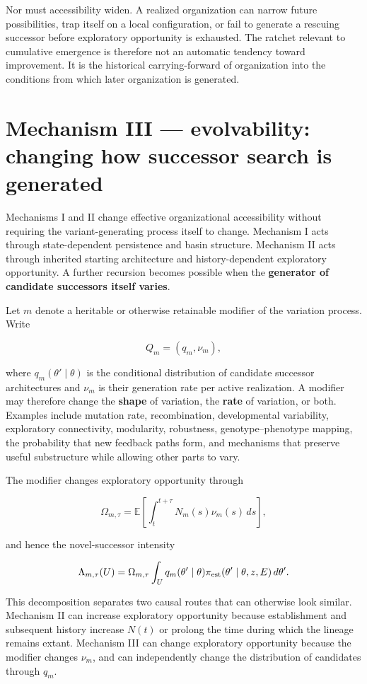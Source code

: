 \documentclass[11pt,a4paper]{article}
\begin{document}
Nor must accessibility widen. A realized organization can narrow future
possibilities, trap itself on a local configuration, or fail to generate
a rescuing successor before exploratory opportunity is exhausted. The
ratchet relevant to cumulative emergence is therefore not an automatic
tendency toward improvement. It is the historical carrying-forward of
organization into the conditions from which later organization is
generated.

\section{Mechanism III --- evolvability: changing how successor search
is
generated}\label{mechanism-iii-evolvability-changing-how-successor-search-is-generated}

Mechanisms I and II change effective organizational accessibility
without requiring the variant-generating process itself to change.
Mechanism I acts through state-dependent persistence and basin
structure. Mechanism II acts through inherited starting architecture and
history-dependent exploratory opportunity. A further recursion becomes
possible when the \textbf{generator of candidate successors itself
varies}.

Let \(m\) denote a heritable or otherwise retainable modifier of the
variation process. Write

\[
Q_m=(q_m,\nu_m),
\]

where \(q_m(\theta'\mid\theta)\) is the conditional distribution of
candidate successor architectures and \(\nu_m\) is their generation rate
per active realization. A modifier may therefore change the
\textbf{shape} of variation, the \textbf{rate} of variation, or both.
Examples include mutation rate, recombination, developmental
variability, exploratory connectivity, modularity, robustness,
genotype--phenotype mapping, the probability that new feedback paths
form, and mechanisms that preserve useful substructure while allowing
other parts to vary.

The modifier changes exploratory opportunity through

\[
\Omega_{m,\tau}
=
\mathbb E\!\left[
\int_t^{t+\tau}N_m(s)\nu_m(s)\,ds
\right],
\]

and hence the novel-successor intensity

\[
\Lambda_{m,\tau}(U)
=
\Omega_{m,\tau}
\int_U
q_m(\theta'\mid\theta)
\pi_{\rm est}(\theta'\mid\theta,z,E)
\,d\theta'.
\]

This decomposition separates two causal routes that can otherwise look
similar. Mechanism II can increase exploratory opportunity because
establishment and subsequent history increase \(N(t)\) or prolong the
time during which the lineage remains extant. Mechanism III can change
exploratory opportunity because the modifier changes \(\nu_m\), and can
independently change the distribution of candidates through \(q_m\).
\end{document}
